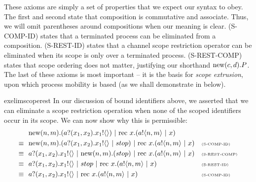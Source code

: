 	These axioms are simply a set of properties that we expect our syntax to obey.  
The first and second state that composition is commutative and associate.  
Thus, we will omit parentheses around compositions when our meaning is clear.  
(S-COMP-ID) states that a terminated process can be eliminated from a composition.  
(S-REST-ID) states that a channel scope restriction operator can be eliminated when its scope is only over a terminated process. (S-REST-COMP) states that scope ordering does not matter, justifying our shorthand $\text{new}({c,d}). P$.  
The last of these axioms is most important -- it is the basis for \emph{scope extrusion}, upon which process mobility is based (as we shall demonstrate in  below).
	
	\begin{example}{exelimscoperest}
		In our discussion of bound identifiers above, we asserted that we can eliminate a scope restriction operation when none of the scoped identifiers occur in its scope. We can now show why this is permissible:
		\begin{align*}
			&\ \text{new}({n,m}).({a}?({x_1,x_2}).{x_1}!\langle{}\rangle)\ |\  \text{rec }{x}.({a}!\langle{n,m}\rangle \ |\  x) &&\\
			\equiv\ &\ \text{new}({n,m}).({a}?({x_1,x_2}).{x_1}!\langle{}\rangle \ |\  stop)\ |\  \text{rec }{x}.({a}!\langle{n,m}\rangle \ |\  x) && \text{\tiny{(S-COMP-ID)}}\\
			\equiv\ &\ {a}?({x_1,x_2}).{x_1}!\langle{}\rangle \ |\  \text{new}({n,m}).(stop)\ |\  \text{rec }{x}.({a}!\langle{n,m}\rangle \ |\  x) && \text{\tiny{(S-REST-COMP)}}\\
			\equiv\ &\ {a}?({x_1,x_2}).{x_1}!\langle{}\rangle \ |\  stop \ |\  \text{rec }{x}.({a}!\langle{n,m}\rangle \ |\  x) && \text{\tiny{(S-REST-ID)}}\\
			\equiv\ &\ {a}?({x_1,x_2}).{x_1}!\langle{}\rangle \ |\  \text{rec }{x}.({a}!\langle{n,m}\rangle \ |\  x) && \text{\tiny{(S-COMP-ID)}}
		\end{align*}
	\end{example}
